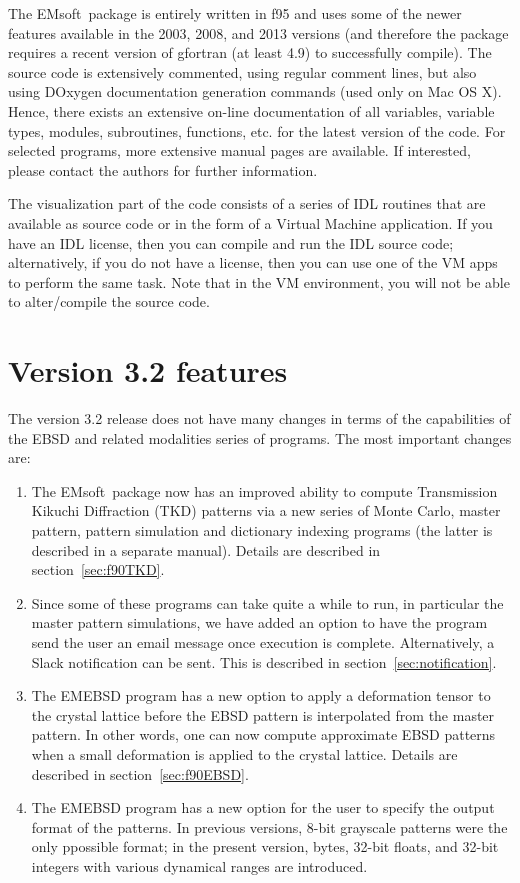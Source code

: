 \documentclass[DIV=calc, paper=letter, fontsize=11pt]{scrartcl}	 %
\newcommand{\ctp}{\textsf{EMsoft}}
\begin{document}
The \ctp\ package is entirely written in f95 and uses some of the newer features available in the 2003, 2008, and 2013 versions (and therefore the package 
requires a recent version of gfortran (at least 4.9) to successfully compile).
The source code is extensively commented, using regular comment lines, but also using DOxygen documentation generation commands (used only on Mac OS X).  Hence,
there exists an extensive on-line documentation of all variables, variable types, modules, subroutines, functions, etc. for the latest version 
of the code.  For selected programs, more extensive manual pages are available.  If interested, please contact the authors for further information.

The visualization part of the code consists of a series of IDL routines that are available as source code or in the form of a Virtual Machine application. 
If you have an IDL license, then you can compile and run the IDL source code; alternatively, if you do not have a license,
then you can use one of the VM apps to perform the same task.  Note that in the VM environment, you will not be able to alter/compile the source code.

\newpage
\section{Version 3.2 features}
The version 3.2 release does not have many changes in terms of the capabilities of the EBSD and related modalities series of programs.  The most important changes are:
\begin{enumerate} 
	\item The \ctp\ package now has an improved ability to compute Transmission Kikuchi Diffraction (TKD) patterns via a new series of Monte Carlo, master pattern, pattern simulation
	and dictionary indexing programs (the latter is described in a separate manual).  Details are described in section~\ref{sec:f90TKD}.
	\item Since some of these programs can take quite a while to run, in particular the master pattern simulations, we have added an option to have the program send the user an email 
	message once execution is complete.  Alternatively, a Slack notification can be sent. This is described in section~\ref{sec:notification}.  
	\item The EMEBSD program has a new option to apply a deformation tensor to the crystal lattice before the EBSD pattern is interpolated from the master pattern.  
	In other words, one can now compute approximate EBSD patterns when a small deformation is applied to the crystal lattice.  Details are described in section~\ref{sec:f90EBSD}.
	\item The EMEBSD program has a new option for the user to specify the output format of the patterns.  In previous versions, 8-bit grayscale patterns were the only ppossible
	format; in the present version, bytes, 32-bit floats, and 32-bit integers with various dynamical ranges are introduced.
\end{enumerate}
\end{document}
